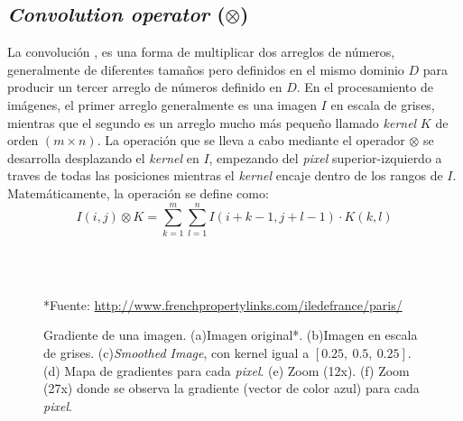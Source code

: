 \subsection{\textit{Convolution operator} ($\otimes$)}
La convolución \cite{Gonzalez:2000:PID, Marques:1999:PDI, Castleman:1996:DIP,Harley:1993:HandBook}, 
es una forma de multiplicar dos arreglos de números, generalmente de 
diferentes tamaños pero definidos en el mismo dominio $D$ para producir un 
tercer arreglo de números definido en $D$.
En el procesamiento de imágenes, el primer arreglo generalmente es una imagen
$I$ en escala de grises, mientras que el segundo es un arreglo mucho más
pequeño llamado \textit{kernel} $K$ de orden $(m \times n)$. La operación que 
se lleva a cabo mediante el operador $\otimes$ se desarrolla desplazando el 
\textit{kernel} en $I$, empezando del \textit{pixel} superior-izquierdo a 
traves de todas las posiciones mientras el \textit{kernel} encaje dentro de 
los rangos de $I$. Matemáticamente, la operación se define como:
\begin{equation}
  I(i, j) \otimes K = \sum_{k=1}^m \sum_{l=1}^n {I(i + k - 1, j + l - 1) \cdot K(k, l)}
\end{equation}

\begin{figure}[h!]
  \centering
   { }
   { }
   \\
   { }
   { }
   \\  
  \caption[Gradiente de una imagen]{Gradiente de una imagen. 
  (a)Imagen original*. (b)Imagen en escala de grises. (c)\textit{Smoothed
  Image}, con kernel igual a $[0.25,~ 0.5,~ 0.25]$. (d) Mapa de gradientes 
  para cada \textit{pixel}. (e) Zoom (12x). (f) Zoom (27x) donde se observa
  la gradiente (vector de color azul) para cada \textit{pixel}.}
  \tiny{*Fuente: \url{http://www.frenchpropertylinks.com/iledefrance/paris/}}
  \label{Fig:cap-marcoteorico:Paris-grad}
\end{figure}

